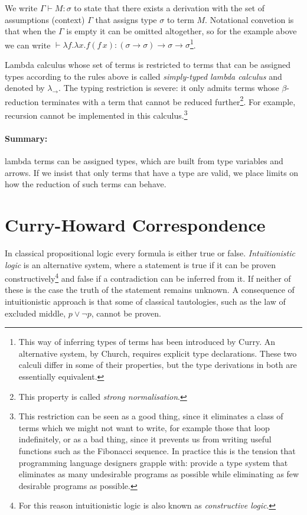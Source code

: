 \documentclass[11pt,twoside,a4paper]{article} %
\begin{document}
We write $\Gamma\vdash M:\sigma$ to state that there exists a derivation with 
the set of assumptions (context) $\Gamma$ that assigns type $\sigma$ to term $M$. 
Notational convetion is that when the $\Gamma$ is empty it
can be omitted altogether, so for the example above we can write
$\vdash \lambda f.\lambda
x.f(f\,x):(\sigma\rightarrow\sigma)\rightarrow\sigma\rightarrow\sigma$\footnote{This
way of inferring types of terms has been introduced by Curry. An alternative
system, by Church, requires explicit type declarations. These two calculi
differ in some of their properties, but the type derivations in both are essentially
equivalent\cite{su99}.}.

Lambda calculus whose set of terms is restricted to terms that can be
assigned types according to the rules above is called \emph{simply-typed lambda
calculus} and denoted by $\lambda_\rightarrow$. The typing restriction is
severe: it only admits terms whose $\beta$-reduction terminates with a term that 
cannot be reduced further\footnote{This property is called \emph{strong normalisation}.}. 
For example, recursion
cannot be implemented in this calculus.\footnote{This restriction can be seen as a good
thing, since it eliminates a class of terms which we might not want to write, for
example those that loop indefinitely, or as a bad thing, since it prevents us
from writing useful functions such as the Fibonacci sequence. In practice this
is the tension that programming language designers grapple with: provide a type
system that eliminates as many undesirable programs as possible while
eliminating as few desirable programs as possible.}

\paragraph{Summary:} lambda terms can be assigned types, which are built from
type variables and arrows. If we insist that only terms that have a type are 
valid, we place limits on how the reduction of such terms can behave.

\section{Curry-Howard Correspondence}

In classical propositional logic every formula is either true or false.
\emph{Intuitionistic logic} is an alternative system, where a statement is true
if it can be proven constructively\footnote{For this reason intuitionistic logic 
is also known as \emph{constructive logic}.} and false if a contradiction can
be inferred from it. If neither of these is the case the truth of the statement
remains unknown. A consequence of intuitionistic approach is that some 
of classical tautologies, such as the law of excluded middle, $p\vee\neg p$, cannot 
be proven.
\end{document}
